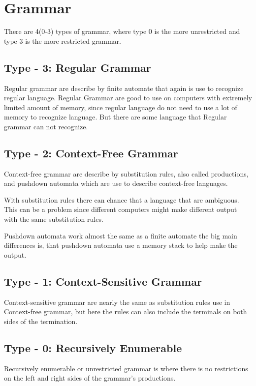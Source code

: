 \section{Grammar}
There are 4(0-3) types of grammar, where type 0 is the more unrestricted and type 3 is the more restricted grammar.

\subsection{Type - 3: Regular Grammar}
Regular grammar are describe by finite automate that again is use to recognize regular language. Regular Grammar are good to use on computers with extremely limited amount of memory, since regular language do not need to use a lot of memory to recognize language. But there are some language that Regular grammar can not recognize.

\subsection{Type - 2: Context-Free Grammar}
Context-free grammar are describe by substitution rules, also called productions, and pushdown automata which are use to describe context-free languages.

With substitution rules there can chance that a language that are ambiguous. 
This can be a problem since different computers might make different output with the same substitution rules.

Pushdown automata work almost the same as a finite automate the big main differences is, that pushdown automata use a memory stack to help make the output.

\subsection{Type - 1: Context-Sensitive Grammar}
Context-sensitive grammar are nearly the same as substitution rules use in Context-free grammar, 
but here the rules can also include the terminals on both sides of the termination.

\subsection{Type - 0: Recursively Enumerable}
Recursively enumerable or unrestricted grammar is where there is no restrictions on the left and right sides of the grammar's productions.

